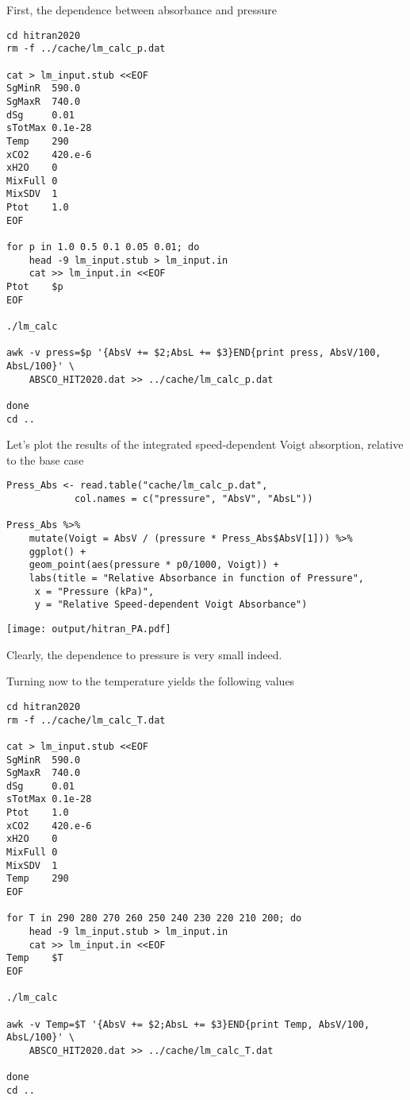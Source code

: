 \documentclass[10pt,a4paper,titlepage]{article}
\begin{document}
First, the dependence between absorbance and pressure
\begin{lstlisting}
cd hitran2020
rm -f ../cache/lm_calc_p.dat

cat > lm_input.stub <<EOF
SgMinR  590.0
SgMaxR  740.0
dSg     0.01
sTotMax 0.1e-28
Temp    290
xCO2    420.e-6
xH2O    0
MixFull 0
MixSDV  1
Ptot    1.0
EOF

for p in 1.0 0.5 0.1 0.05 0.01; do
    head -9 lm_input.stub > lm_input.in
    cat >> lm_input.in <<EOF
Ptot    $p
EOF

./lm_calc

awk -v press=$p '{AbsV += $2;AbsL += $3}END{print press, AbsV/100, AbsL/100}' \
    ABSCO_HIT2020.dat >> ../cache/lm_calc_p.dat

done
cd ..
\end{lstlisting}

Let's plot the results of the integrated speed-dependent Voigt
absorption, relative to the base case
\begin{lstlisting}
Press_Abs <- read.table("cache/lm_calc_p.dat",
			col.names = c("pressure", "AbsV", "AbsL"))

Press_Abs %>%
    mutate(Voigt = AbsV / (pressure * Press_Abs$AbsV[1])) %>%
    ggplot() +
    geom_point(aes(pressure * p0/1000, Voigt)) +
    labs(title = "Relative Absorbance in function of Pressure",
	 x = "Pressure (kPa)",
	 y = "Relative Speed-dependent Voigt Absorbance")
\end{lstlisting}

\texttt{[image: output/hitran\_PA.pdf]}

Clearly, the dependence to pressure is very small indeed.

Turning now to the temperature yields the following values
\begin{lstlisting}
cd hitran2020
rm -f ../cache/lm_calc_T.dat

cat > lm_input.stub <<EOF
SgMinR  590.0
SgMaxR  740.0
dSg     0.01
sTotMax 0.1e-28
Ptot    1.0
xCO2    420.e-6
xH2O    0
MixFull 0
MixSDV  1
Temp    290
EOF

for T in 290 280 270 260 250 240 230 220 210 200; do
    head -9 lm_input.stub > lm_input.in
    cat >> lm_input.in <<EOF
Temp    $T
EOF

./lm_calc

awk -v Temp=$T '{AbsV += $2;AbsL += $3}END{print Temp, AbsV/100, AbsL/100}' \
    ABSCO_HIT2020.dat >> ../cache/lm_calc_T.dat

done
cd ..
\end{lstlisting}
\end{document}

